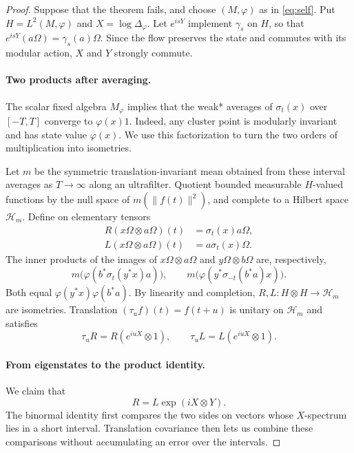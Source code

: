 \documentclass[11pt]{article}
\theoremstyle{definition}
\begin{document}
\begin{proof}
Suppose that the theorem fails, and choose $(M,\varphi)$ as in
\eqref{eq:self}. Put $H=L^2(M,\varphi)$ and $X=\log\Delta_\varphi$.
Let $e^{isY}$ implement $\gamma_s$ on $H$, so that
$e^{isY}(a\Omega)=\gamma_s(a)\Omega$. Since the flow preserves the state and
commutes with its modular action, $X$ and $Y$ strongly commute.

\paragraph{Two products after averaging.}
The scalar fixed algebra $M_\varphi$ implies that the weak* averages of
$\sigma_t(x)$ over $[-T,T]$ converge to $\varphi(x)1$. Indeed, any cluster
point is modularly invariant and has state value $\varphi(x)$. We use this
factorization to turn the two orders of multiplication into isometries.

Let $m$ be the symmetric translation-invariant mean obtained from these
interval averages as $T\to\infty$ along an ultrafilter. Quotient bounded
measurable $H$-valued functions by the null space of
$m(\|f(t)\|^2)$, and complete to a Hilbert space $\mathcal H_m$.
Define on elementary tensors
\begin{align*}
 R(x\Omega\otimes a\Omega)(t)&=\sigma_t(x)a\Omega,\\
 L(x\Omega\otimes a\Omega)(t)&=a\sigma_t(x)\Omega.
\end{align*}
The inner products of the images of $x\Omega\otimes a\Omega$ and
$y\Omega\otimes b\Omega$ are, respectively,
\[
 m\big(\varphi(b^*\sigma_t(y^*x)a)\big),\qquad
 m\big(\varphi(y^*\sigma_{-t}(b^*a)x)\big).
\]
Both equal $\varphi(y^*x)\varphi(b^*a)$. By linearity and completion,
$R,L:H\otimes H\to\mathcal H_m$ are isometries. Translation
$(\tau_u f)(t)=f(t+u)$ is unitary on $\mathcal H_m$ and satisfies
\[
 \tau_uR=R(e^{iuX}\otimes1),\qquad
 \tau_uL=L(e^{iuX}\otimes1).
\]

\paragraph{From eigenstates to the product identity.}
We claim that
\begin{equation}\label{eq:absolute-RL}
 R=L\exp(iX\otimes Y).
\end{equation}
The binormal identity first compares the two sides on vectors whose
$X$-spectrum lies in a short interval. Translation covariance then lets us
combine these comparisons without accumulating an error over the intervals.


\end{proof}
\end{document}
